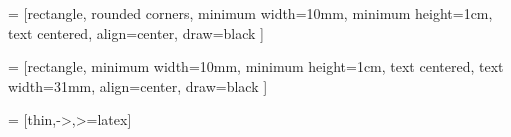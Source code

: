 \usepackage{tikz}
\usepackage{fontawesome5}
\usetikzlibrary{shapes.geometric, arrows, positioning}

 = [rectangle, rounded corners,
minimum width=10mm,
minimum height=1cm,
text centered,
align=center,
draw=black
]

 = [rectangle,
minimum width=10mm,
minimum height=1cm,
text centered,
text width=31mm,
align=center,
draw=black
]

 = [thin,->,>=latex]